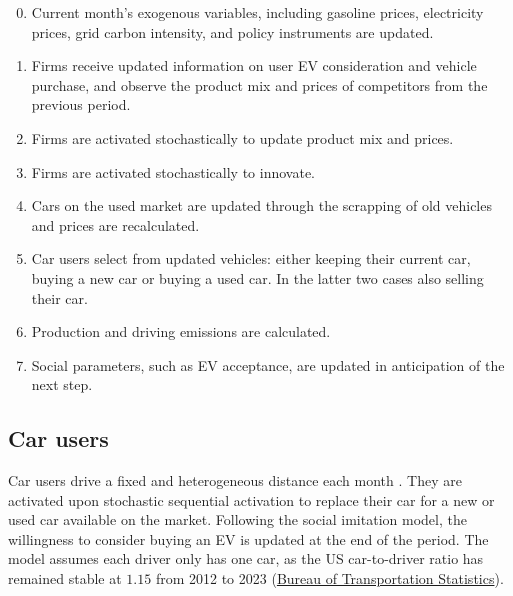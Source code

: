 \documentclass[12pt]{article}
\begin{document}
        \begin{enumerate}
            \setcounter{enumi}{-1} %
            \item Current month's exogenous variables, including gasoline prices, electricity 
            prices, grid carbon intensity, and policy instruments are updated.
            \item Firms receive updated information on user EV consideration and vehicle 
            purchase, and observe the product mix and prices of competitors from the previous period.
            \item Firms are activated stochastically to update product mix and prices.
            \item Firms are activated stochastically to innovate.
            \item Cars on the used market are updated through the scrapping of old vehicles and prices are recalculated.
            \item Car users select from updated vehicles: either keeping their current car, buying a new car or buying a used car. In the latter two cases also selling their car.
            \item Production and driving emissions are calculated.
            \item Social parameters, such as EV acceptance, are updated in anticipation of 
            the next step.
        \end{enumerate}

	\subsection{Car users} \label{Model_Users}
	Car users drive a fixed and heterogeneous distance each month \citep{zhang2025effect}. They are activated upon stochastic sequential activation to replace their car for a new or used car available on the market. Following the social imitation model, the willingness to consider buying an EV is updated at the end of the period. The model assumes each driver only has one car, as the US car-to-driver ratio has remained stable at $1.15$ from 2012 to 2023 (\href{https://www.bts.gov/browse-statistical-products-and-data/state-transportation-statistics/state-highway-travel}{Bureau of Transportation Statistics}). %
\end{document}

